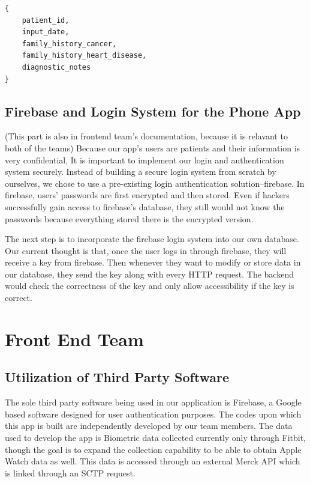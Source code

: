 \documentclass[]{book}
\begin{document}
\begin{verbatim}
{
    patient_id,
    input_date,
    family_history_cancer,
    family_history_heart_disease,
    diagnostic_notes
}
\end{verbatim}

\section{Firebase and Login System for the Phone
App}\label{firebase-and-login-system-for-the-phone-app}

(This part is also in frontend team's documentation, because it is
relavant to both of the teams) Because our app's users are patients and
their information is very confidential, It is important to implement our
login and authentication system securely. Instead of building a secure
login system from scratch by ourselves, we chose to use a pre-existing
login authentication solution--firebase. In firebase, users' passwords
are first encrypted and then stored. Even if hackers successfully gain
access to firebase's database, they still would not know the passwords
because everything stored there is the encrypted version.

The next step is to incorporate the firebase login system into our own
database. Our current thought is that, once the user logs in through
firebase, they will receive a key from firebase. Then whenever they want
to modify or store data in our database, they send the key along with
every HTTP request. The backend would check the correctness of the key
and only allow accessibility if the key is correct.

\chapter{Front End Team}\label{front-end-team}

\section{Utilization of Third Party
Software}\label{utilization-of-third-party-software}

The sole third party software being used in our application is Firebase,
a Google based software designed for user authentication purposes. The
codes upon which this app is built are independently developed by our
team members. The data used to develop the app is Biometric data
collected currently only through Fitbit, though the goal is to expand
the collection capability to be able to obtain Apple Watch data as well.
This data is accessed through an external Merck API which is linked
through an SCTP request.
\end{document}
